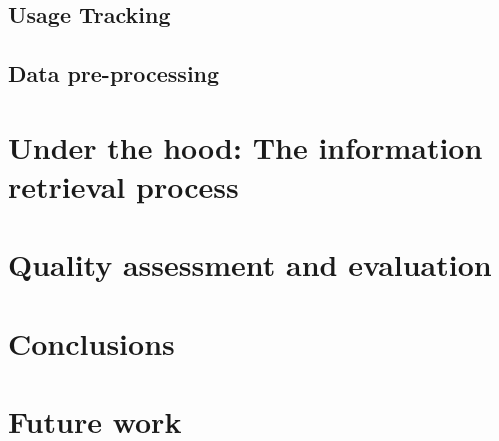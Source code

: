 \documentclass[]{usiinfbachelorproject}
\begin{document}
\subsection{Usage Tracking}

\subsection{Data pre-processing}


\section{Under the hood: The information retrieval process} \label{ir}



\section{Quality assessment and evaluation} \label{evaluation}



\section{Conclusions} \label{conclusions}



\section{Future work} \label{futureWork}





\newpage



\end{document}
